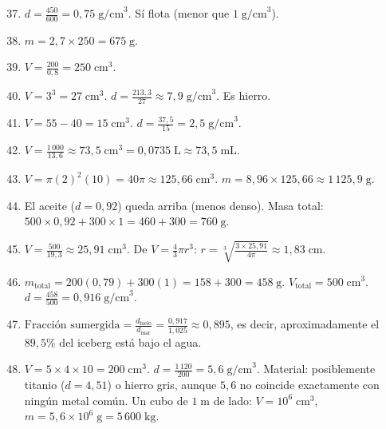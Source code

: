 \documentclass[12pt, a4paper]{article}
\begin{document}
\begin{enumerate}[leftmargin=*, label=\textbf{\arabic*.}]
  \setcounter{enumi}{36}
  \item $d = \frac{450}{600} = 0{,}75\;\text{g/cm}^3$. Sí flota (menor que $1\;\text{g/cm}^3$).

  \item $m = 2{,}7 \times 250 = 675\;\text{g}$.

  \item $V = \frac{200}{0{,}8} = 250\;\text{cm}^3$.

  \item $V = 3^3 = 27\;\text{cm}^3$. $d = \frac{213{,}3}{27} \approx 7{,}9\;\text{g/cm}^3$. Es hierro.

  \item $V = 55 - 40 = 15\;\text{cm}^3$. $d = \frac{37{,}5}{15} = 2{,}5\;\text{g/cm}^3$.

  \item $V = \frac{1\,000}{13{,}6} \approx 73{,}5\;\text{cm}^3 = 0{,}0735\;\text{L} \approx 73{,}5\;\text{mL}$.

  \item $V = \pi(2)^2(10) = 40\pi \approx 125{,}66\;\text{cm}^3$. $m = 8{,}96 \times 125{,}66 \approx 1\,125{,}9\;\text{g}$.

  \item El aceite ($d = 0{,}92$) queda arriba (menos denso). Masa total: $500 \times 0{,}92 + 300 \times 1 = 460 + 300 = 760\;\text{g}$.

  \item $V = \frac{500}{19{,}3} \approx 25{,}91\;\text{cm}^3$. De $V = \frac{4}{3}\pi r^3$: $r = \sqrt[3]{\frac{3 \times 25{,}91}{4\pi}} \approx 1{,}83\;\text{cm}$.

  \item $m_{\text{total}} = 200(0{,}79) + 300(1) = 158 + 300 = 458\;\text{g}$. $V_{\text{total}} = 500\;\text{cm}^3$. $d = \frac{458}{500} = 0{,}916\;\text{g/cm}^3$.

  \item $\text{Fracción sumergida} = \frac{d_{\text{hielo}}}{d_{\text{mar}}} = \frac{0{,}917}{1{,}025} \approx 0{,}895$, es decir, aproximadamente el $89{,}5\%$ del iceberg está bajo el agua.

  \item $V = 5 \times 4 \times 10 = 200\;\text{cm}^3$. $d = \frac{1\,120}{200} = 5{,}6\;\text{g/cm}^3$. Material: posiblemente titanio ($d = 4{,}51$) o hierro gris, aunque $5{,}6$ no coincide exactamente con ningún metal común. Un cubo de $1\;\text{m}$ de lado: $V = 10^6\;\text{cm}^3$, $m = 5{,}6 \times 10^6\;\text{g} = 5\,600\;\text{kg}$.
\end{enumerate}
\end{document}
